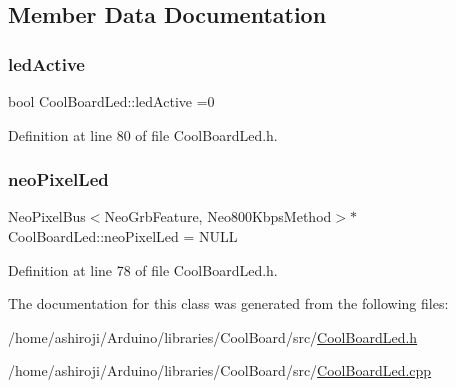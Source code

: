 \subsection{Member Data Documentation}
\mbox{\label{class_cool_board_led_aadd04d2ecf123247718d77f42fba7f08}} 
\subsubsection{\texorpdfstring{led\+Active}{ledActive}}
{\footnotesize\ttfamily bool Cool\+Board\+Led\+::led\+Active =0\hspace{0.3cm}{\ttfamily [private]}}



Definition at line 80 of file Cool\+Board\+Led.\+h.

\mbox{\label{class_cool_board_led_ac2c13fa462a010cd9242bf297c013923}} 
\subsubsection{\texorpdfstring{neo\+Pixel\+Led}{neoPixelLed}}
{\footnotesize\ttfamily Neo\+Pixel\+Bus$<$Neo\+Grb\+Feature, Neo800\+Kbps\+Method$>$$\ast$ Cool\+Board\+Led\+::neo\+Pixel\+Led = N\+U\+LL\hspace{0.3cm}{\ttfamily [private]}}



Definition at line 78 of file Cool\+Board\+Led.\+h.



The documentation for this class was generated from the following files\+:\begin{DoxyCompactItemize}
\item 
/home/ashiroji/\+Arduino/libraries/\+Cool\+Board/src/\hyperlink{_cool_board_led_8h}{Cool\+Board\+Led.\+h}\item 
/home/ashiroji/\+Arduino/libraries/\+Cool\+Board/src/\hyperlink{_cool_board_led_8cpp}{Cool\+Board\+Led.\+cpp}\end{DoxyCompactItemize}
